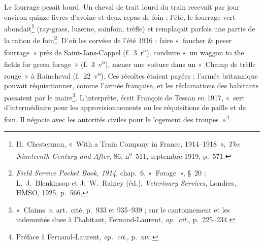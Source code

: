 Le fourrage pesait lourd. Un cheval de trait lourd du train recevait par jour environ quinze livres d'avoine et deux repas de foin ; l'été, le fourrage vert abondait\footnote{H.~Chesterman, «~With a Train Company in France, 1914--1918~», \textit{The Nineteenth Century and After}, 86, n\textsuperscript{o}~511, septembre 1919, p.~571.} (ray-grass, luzerne, sainfoin, trèfle) et remplaçait parfois une partie de la ration de foin\footnote{\textit{Field Service Pocket Book, 1914}, chap.~6, «~Forage~», §~20 ; L.~J.~Blenkinsop et J.~W.~Rainey (éd.), \textit{Veterinary Services}, Londres, HMSO, 1925, p.~566.}. D'où les corvées de l'été 1916 : faire «~faucher \& peser fourrage~» près de Saint-Jans-Cappel (f.~3~r\textsuperscript{o}), conduire «~un waggon to the fields for green forage~» (f.~3~v\textsuperscript{o}), mener une voiture dans un «~Champ de trèfle rouge~» à Raincheval (f.~22~v\textsuperscript{o}). Ces récoltes étaient payées : l'armée britannique pouvait réquisitionner, comme l'armée française, et les réclamations des habitants passaient par le maire\footnote{«~Claims~», art.~cité, p.~933 et 935--939 ; sur le cantonnement et les indemnités dues à l'habitant, Fernand-Laurent, \textit{op.~cit.}, p.~225--234.}. L'interprète, écrit François de Tessan en 1917, «~sert d'intermédiaire pour les approvisionnements ou les réquisitions de paille et de foin. Il négocie avec les autorités civiles pour le logement des troupes~»\footnote{Préface à Fernand-Laurent, \textit{op.~cit.}, p.~\textsc{xiv}.}.

